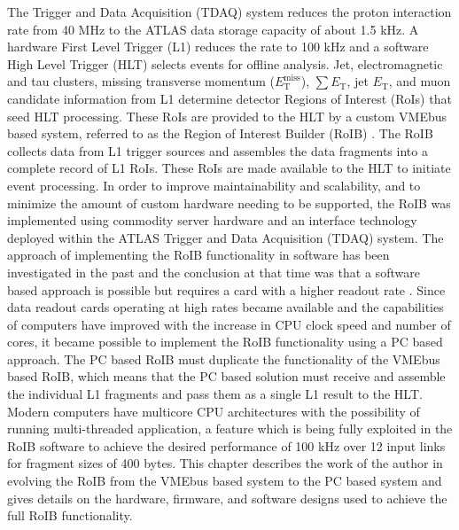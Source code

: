 The Trigger and Data Acquisition (TDAQ) system reduces the 
proton interaction rate from 40 MHz to the ATLAS data storage capacity of about 1.5 kHz. 
A hardware First Level Trigger (L1) reduces the rate to 100 kHz and a software High Level Trigger (HLT) selects events for offline analysis. 
Jet, electromagnetic and tau clusters, missing transverse momentum ($E_{\mathrm{T}}^{\mathrm{miss}}$), $\sum E_{\mathrm{T}}$, 
jet $E_{\mathrm{T}}$, and muon candidate information from L1 determine detector Regions of Interest (RoIs) that seed HLT processing. These RoIs are provided to the HLT by a custom VMEbus based system, referred to as the Region of Interest Builder (RoIB) \cite{vme_roib}.
The RoIB collects data from L1 
trigger sources and assembles the data fragments into a complete record of L1 RoIs. These RoIs are made available to the HLT to initiate event processing. In order to improve maintainability and scalability, and to minimize the amount of custom hardware needing to be supported, 
the RoIB was implemented using commodity server hardware and an interface technology deployed 
within the ATLAS Trigger and Data Acquisition (TDAQ) system. The approach of implementing the RoIB functionality in software has been investigated in the past 
and the conclusion at that time was that a software based approach is possible but requires a card with a higher readout rate \cite{swroib_past}. 
Since data readout cards operating at high rates became available and the capabilities of computers have improved with the increase 
in CPU clock speed and number of cores, it became possible to implement the RoIB functionality using a PC based approach. 
The PC based RoIB must duplicate the functionality of the VMEbus based RoIB,
 which means that the PC based solution must receive and assemble the
individual L1 fragments and pass them as a single L1 result to the HLT. Modern computers have multicore CPU architectures 
with the possibility of running multi-threaded application, a feature which is being fully exploited in the RoIB software to achieve 
the desired performance of 100 kHz over 12 input links for fragment sizes of 400 bytes.  
This chapter describes the work of the author in evolving the RoIB from the VMEbus based system to the PC based system and gives details on the hardware, 
firmware, and software designs used to achieve the full RoIB functionality. 



